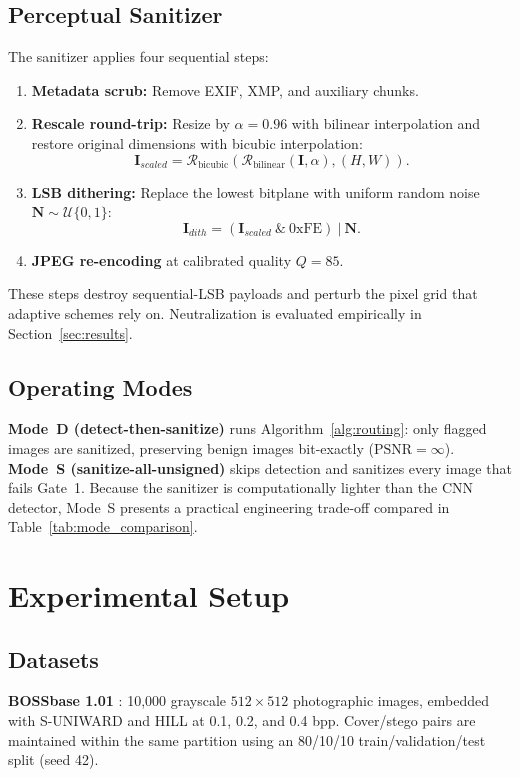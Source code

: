 \documentclass[conference]{IEEEtran}
\begin{document}
\subsection{Perceptual Sanitizer}
The sanitizer applies four sequential steps:
\begin{enumerate}
    \item \textbf{Metadata scrub:} Remove EXIF, XMP, and auxiliary chunks.
    \item \textbf{Rescale round-trip:} Resize by $\alpha = 0.96$ with bilinear interpolation and restore original dimensions with bicubic interpolation:
    \begin{equation}
        \mathbf{I}_{scaled} = \mathcal{R}_{\text{bicubic}}(\mathcal{R}_{\text{bilinear}}(\mathbf{I}, \alpha), (H, W)).
    \end{equation}
    \item \textbf{LSB dithering:} Replace the lowest bitplane with uniform random noise $\mathbf{N} \sim \mathcal{U}\{0, 1\}$:
    \begin{equation}
        \mathbf{I}_{dith} = (\mathbf{I}_{scaled} \ \& \ \text{0xFE}) \ | \ \mathbf{N}.
    \end{equation}
    \item \textbf{JPEG re-encoding} at calibrated quality $Q = 85$.
\end{enumerate}
These steps destroy sequential-LSB payloads and perturb the pixel grid that adaptive schemes rely on. Neutralization is evaluated empirically in Section~\ref{sec:results}.

\subsection{Operating Modes}
\textbf{Mode~D (detect-then-sanitize)} runs Algorithm~\ref{alg:routing}: only flagged images are sanitized, preserving benign images bit-exactly ($\text{PSNR} = \infty$). \textbf{Mode~S (sanitize-all-unsigned)} skips detection and sanitizes every image that fails Gate~1. Because the sanitizer is computationally lighter than the CNN detector, Mode~S presents a practical engineering trade-off compared in Table~\ref{tab:mode_comparison}.

\section{Experimental Setup}
\label{sec:setup}

\subsection{Datasets}
\textbf{BOSSbase 1.01} \cite{bas2011break}: 10,000 grayscale $512 \times 512$ photographic images, embedded with S-UNIWARD \cite{holub2014universal} and HILL \cite{li2014new} at 0.1, 0.2, and 0.4 bpp. Cover/stego pairs are maintained within the same partition using an 80/10/10 train/validation/test split (seed 42).
\end{document}
